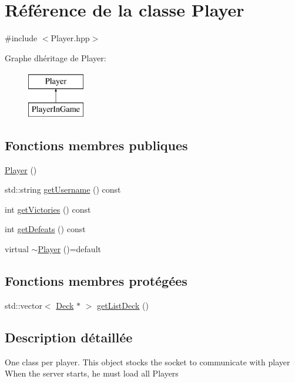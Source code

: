 \hypertarget{classPlayer}{}\section{Référence de la classe Player}
\label{classPlayer}


{\ttfamily \#include $<$Player.\+hpp$>$}

Graphe d\textquotesingle{}héritage de Player\+:\begin{figure}[H]
\begin{center}
\leavevmode
\includegraphics[height=2.000000cm]{classPlayer}
\end{center}
\end{figure}
\subsection*{Fonctions membres publiques}
\begin{DoxyCompactItemize}
\item 
\hyperlink{classPlayer_affe0cc3cb714f6deb4e62f0c0d3f1fd8}{Player} ()
\item 
std\+::string \hyperlink{classPlayer_aa03cfa2695b0b22dbfd2820484575113}{get\+Username} () const 
\item 
int \hyperlink{classPlayer_a25141f641ef132c8c3cb37060841ca4d}{get\+Victories} () const 
\item 
int \hyperlink{classPlayer_ab8a8f531e71dbf5bd5366cdd309bbbda}{get\+Defeats} () const 
\item 
virtual \hyperlink{classPlayer_a11017c0ed8a639f3b1308ab167fbeca2}{$\sim$\+Player} ()=default
\end{DoxyCompactItemize}
\subsection*{Fonctions membres protégées}
\begin{DoxyCompactItemize}
\item 
std\+::vector$<$ \hyperlink{classDeck}{Deck} $\ast$ $>$ \hyperlink{classPlayer_ad3e0232a0013556f3dc6a7cf3219c5e3}{get\+List\+Deck} ()
\end{DoxyCompactItemize}


\subsection{Description détaillée}
One class per player. This object stocks the socket to communicate with player When the server starts, he must load all Players 

